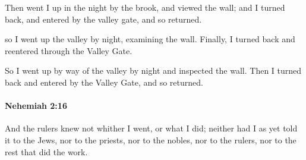 			\begin{versebox}
					\item[BHS] 
					\item[LXX] 
					\item[ASV] Then went I up in the night by the brook, and viewed the wall; and I turned back, and entered by the valley gate, and so returned.
					\item[NIV] so I went up the valley by night, examining the wall. Finally, I turned back and reentered through the Valley Gate.
					\item[NRSV] So I went up by way of the valley by night and inspected the wall. Then I turned back and entered by the Valley Gate, and so returned.
			\end{versebox}

		\paragraph{Nehemiah 2:16} %
			\label{NEHEMIAH-2-16}

			And the rulers knew not whither I went, or what I did; neither had I as yet told it to the Jews, nor to the priests, nor to the nobles, nor to the rulers, nor to the rest that did the work.

